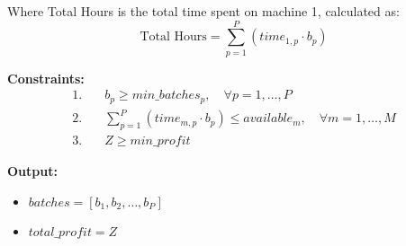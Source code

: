\documentclass{article}
\begin{document}
Where Total Hours is the total time spent on machine 1, calculated as:
\[
\text{Total Hours} = \sum_{p=1}^P (time_{1,p} \cdot b_p)
\]

\textbf{Constraints:}
\begin{align*}
    1. & \quad b_p \geq min\_batches_p, \quad \forall p = 1, \ldots, P \\
    2. & \quad \sum_{p=1}^P (time_{m,p} \cdot b_p) \leq available_m, \quad \forall m = 1, \ldots, M \\
    3. & \quad Z \geq min\_profit
\end{align*}

\textbf{Output:}
\begin{itemize}
    \item \( batches = [b_1, b_2, \ldots, b_P] \)
    \item \( total\_profit = Z \)
\end{itemize}
\end{document}
